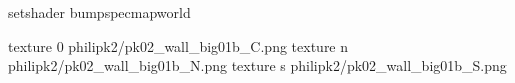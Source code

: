 setshader bumpspecmapworld

texture 0 philipk2/pk02_wall_big01b_C.png
texture n philipk2/pk02_wall_big01b_N.png
texture s philipk2/pk02_wall_big01b_S.png


